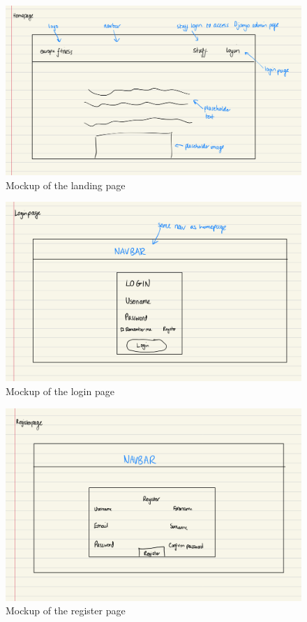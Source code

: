 \documentclass{article}
\begin{document}
\begin{figure}
  \centering
  \includegraphics[width=1\textwidth]{Figure 13.jpeg}
  \caption{Mockup of the landing page}
\end{figure}

\begin{figure}
  \centering
  \includegraphics[width=1\textwidth]{Figure 14.jpeg}
  \caption{Mockup of the login page}
\end{figure}

\begin{figure}
  \centering
  \includegraphics[width=1\textwidth]{Figure 15.jpeg}
  \caption{Mockup of the register page}
\end{figure}
\end{document}

